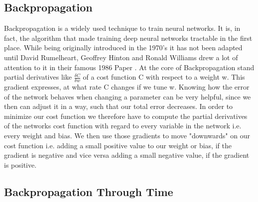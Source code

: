 \subsection{Backpropagation} 
Backpropagation is a widely used technique to train neural networks. It is, in fact, the algorithm that made training deep neural networks tractable in the first place. While being originally introduced in the 1970's it has not been adapted until David Rumelheart, Geoffrey Hinton and Ronald Williams drew a lot of attention to it in their famous 1986 Paper \cite{rumelhart1988learning}. At the core of Backpropagation stand partial derivatives like $\frac{\delta C}{\delta w}$ of a cost function C with respect to a weight w. This gradient expresses, at what rate C changes if we tune w. Knowing how the error of the network behaves when changing a parameter can be very helpful, since we then can adjust it in a way, such that our total error decreases.
In order to minimize our cost function we therefore have to compute the partial derivatives of the networks cost function with regard to every variable in the network i.e. every weight and bias. We then use those gradients to move "downwards" on our cost function i.e. adding a small positive value to our weight or bias, if the gradient is negative and vice versa adding a small negative value, if the gradient is positive.
\\
\subsection{Backpropagation Through Time}